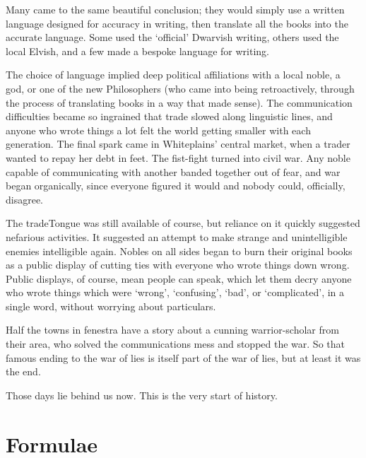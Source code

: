 \begin{multicols}{2}
\begin{exampletext}
    Many came to the same beautiful conclusion; they would simply use a written language designed for accuracy in writing, then translate all the books into the accurate language.
    Some used the `official' Dwarvish writing, others used the local Elvish, and a few made a bespoke language for writing.

    The choice of language implied deep political affiliations with a local noble, a god, or one of the new Philosophers (who came into being retroactively, through the process of translating books in a way that made sense).
    The communication difficulties became so ingrained that trade slowed along linguistic lines, and anyone who wrote things a lot felt the world getting smaller with each generation.
    The final spark came in Whiteplains' central market, when a trader wanted to repay her debt in feet.
    The fist-fight turned into civil war.
    Any noble capable of communicating with another banded together out of fear, and war began organically, since everyone figured it would and nobody could, officially, disagree.

    The \gls{tradeTongue} was still available of course, but reliance on it quickly suggested nefarious activities.
    It suggested an attempt to make strange and unintelligible enemies intelligible again.
    Nobles on all sides began to burn their original books as a public display of cutting ties with everyone who wrote things down wrong.
    Public displays, of course, mean people can speak, which let them decry anyone who wrote things which were `wrong', `confusing', `bad', or `complicated', in a single word, without worrying about particulars.

    Half the towns in \gls{fenestra} have a story about a cunning warrior-scholar from their area, who solved the communications mess and stopped the war.
    So that famous ending to the war of lies is itself part of the war of lies, but at least it was the end.

    Those days lie behind us now.
    This is the very start of history.
  \fi

\end{exampletext}

\end{multicols}

\section{Formulae}

